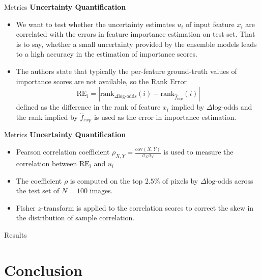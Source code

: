 \documentclass[10pt]{beamer}
\begin{document}
\begin{frame}{Metrics}
\textbf{Uncertainty Quantification}
\begin{itemize}
\item We want to test whether the uncertainty estimates $u_i $ of input feature $x_i $ are correlated with the errors in feature importance estimation on test set. That is to say, whether a small uncertainty provided by the ensemble models leads to a high accuracy in the estimation of importance scores.

\item The authors state that typically the per-feature ground-truth values of importance scores are not available, so the Rank Error $$\text{RE}_i = |\text{rank}_{\Delta\text{log-odds}}(i) - \text{rank}_{\hat{f}_{exp}}(i)| $$
defined as the difference in the rank of feature $x_i $ implied by $\Delta\text{log-odds}$ and the rank implied by $\hat{f}_{exp} $ is used as the error in importance estimation.
\end{itemize}
\end{frame}

\begin{frame}{Metrics}
\textbf{Uncertainty Quantification}
\begin{itemize}
\item Pearson correlation coefficient $\rho_{X, Y} = \frac{\text{cov}(X, Y)}{\sigma_X\sigma_Y} $ is used to measure the correlation between $\text{RE}_i $ and $u_i$
\item The coefficient $\rho$ is computed on the top $2.5\%$ of pixels by $\Delta\text{log-odds}$ across the test set of $N=100$ images.
\item Fisher $z$-transform is applied to the correlation scores to correct the skew in the distribution of sample correlation.
\end{itemize}
\end{frame}

\begin{frame}{Results}

\end{frame}

\section{Conclusion}
\end{document}
